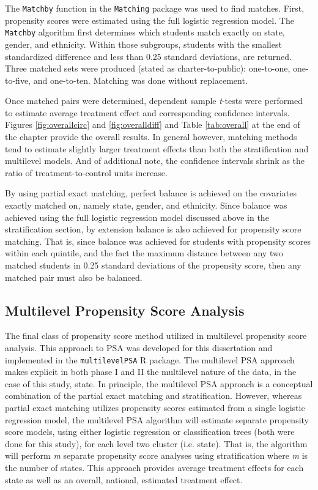 \documentclass[letterpaper,12p,twoside]{article} %
\begin{document}
The \texttt{Matchby} function in the \texttt{Matching} package \cite{matching} was used to find matches. First, propensity scores were estimated using the full logistic regression model. The \texttt{Matchby} algorithm first determines which students match exactly on state, gender, and ethnicity. Within those subgroups, students with the smallest standardized difference and less than 0.25 standard deviations, are returned. Three matched sets were produced (stated as charter-to-public): one-to-one, one-to-five, and one-to-ten. Matching was done without replacement.

Once matched pairs were determined, dependent sample \textit{t}-tests were performed \cite{Austin2011} to estimate average treatment effect and corresponding confidence intervals. Figures \ref{fig:overallcirc} and \ref{fig:overalldiff} and Table \ref{tab:overall} at the end of the chapter provide the overall results. In general however, matching methods tend to estimate slightly larger treatment effects than both the stratification and multilevel models. And of additional note, the confidence intervals shrink as the ratio of treatment-to-control units increase.

By using partial exact matching, perfect balance is achieved on the covariates exactly matched on, namely state, gender, and ethnicity. Since balance was achieved using the full logistic regression model discussed above in the stratification section, by extension balance is also achieved for propensity score matching. That is, since balance was achieved for students with propensity scores within each quintile, and the fact the maximum distance between any two matched students in 0.25 standard deviations of the propensity score, then any matched pair must also be balanced.

\subsection{Multilevel Propensity Score Analysis}

The final class of propensity score method utilized in multilevel propensity score analysis. This approach to PSA was developed for this dissertation and implemented in the \texttt{multilevelPSA} R package. The multilevel PSA approach makes explicit in both phase I and II the multilevel nature of the data, in the case of this study, state. In principle, the multilevel PSA approach is a conceptual combination of the partial exact matching and stratification. However, whereas partial exact matching utilizes propensity scores estimated from a single logistic regression model, the multilevel PSA algorithm will estimate separate propensity score models, using either logistic regression or classification trees (both were done for this study), for each level two cluster (i.e. state). That is, the algorithm will perform \textit{m} separate propensity score analyses using stratification where \textit{m} is the number of states. This approach provides average treatment effects for each state as well as an overall, national, estimated treatment effect.
\end{document}
